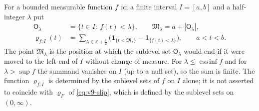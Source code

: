 \documentclass[11pt,a4paper]{article}
\numberwithin{equation}{section}
\theoremstyle{definition}
\theoremstyle{remark}
\newcommand{\ind}{\mathbf 1}
\begin{document}
For a bounded measurable function $f$ on a finite interval $I=[a,b]$ and a half-integer $\lambda$ put
\begin{equation}\label{eq:taucw-local}
\begin{aligned}
\mathsf O_\lambda&=\{t\in I:\ f(t)<\lambda\},\qquad\mathfrak M_\lambda=a+|\mathsf O_\lambda|,\\
\varrho_{f;I}(t)&=\sum_{\lambda\in\mathbb Z+\frac12}\bigl(\ind_{\{t<\mathfrak M_\lambda\}}-\ind_{\{f(t)<\lambda\}}\bigr),\qquad a<t<b.
\end{aligned}
\end{equation}
The point $\mathfrak M_\lambda$ is the position at which the sublevel set $\mathsf O_\lambda$ would end if it were moved to the left end of $I$ without change of measure. For $\lambda\le\operatorname{ess\,inf}f$ and for $\lambda>\sup f$ the summand vanishes on $I$ (up to a null set), so the sum is finite. The function $\varrho_{f;I}$ is determined by the sublevel sets of $f$ on $I$ alone; it is not asserted to coincide with $\varrho_F$ of \eqref{eq:v9-slip}, which is defined by the sublevel sets on $(0,\infty)$.
\end{document}
